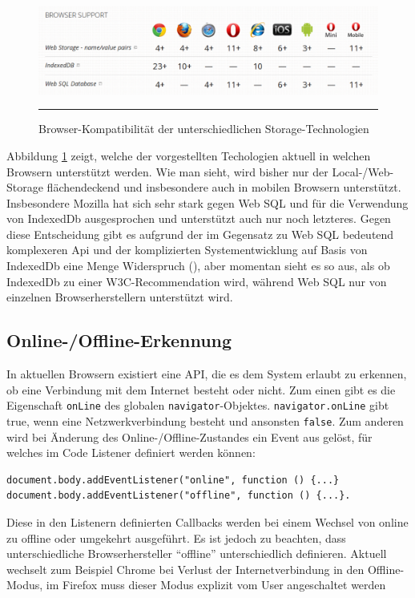 \begin{figure}[h]
  \centering
  \includegraphics[width=\textwidth,height=\textheight,keepaspectratio]{./Figures/storage_browser_compatibility.pdf}
    \rule{35em}{0.5pt}
  \caption[Storage Browser Kompatibilität]{Browser-Kompatibilität der unterschiedlichen Storage-Technologien}
  \label{fig:storage_browser_compatibility}
\end{figure}

Abbildung \ref{fig:storage_browser_compatibility} zeigt, welche der vorgestellten Techologien aktuell in welchen Browsern unterstützt werden. Wie man sieht, wird bisher nur der Local-/Web-Storage flächendeckend und insbesondere auch in mobilen Browsern unterstützt. Insbesondere Mozilla hat sich sehr stark gegen Web SQL und für die Verwendung von IndexedDb ausgesprochen und unterstützt auch nur noch letzteres. Gegen diese Entscheidung gibt es aufgrund der im Gegensatz zu Web SQL bedeutend komplexeren Api und der komplizierten Systementwicklung auf Basis von IndexedDb eine Menge Widerspruch (\cite{Ranganathan2010}), aber momentan sieht es so aus, als ob IndexedDb zu einer W3C-Recommendation wird, während Web SQL nur von einzelnen Browserherstellern unterstützt wird.

\subsection{Online-/Offline-Erkennung}\label{section:online_offline_erkennung}
In aktuellen Browsern existiert eine API, die es dem System erlaubt zu erkennen, ob eine Verbindung mit dem Internet besteht oder nicht. Zum einen gibt es die Eigenschaft \texttt{onLine} des globalen \texttt{navigator}-Objektes. \texttt{navigator.onLine} gibt true, wenn eine Netzwerkverbindung besteht und ansonsten \texttt{false}. Zum anderen wird bei Änderung des Online-/Offline-Zustandes ein Event aus gelöst, für welches im Code Listener definiert werden können:  

\begin{lstlisting}
document.body.addEventListener("online", function () {...} 
document.body.addEventListener("offline", function () {...}.
\end{lstlisting}          
Diese in den Listenern definierten Callbacks werden bei einem Wechsel von online zu offline oder umgekehrt ausgeführt. Es ist jedoch zu beachten, dass unterschiedliche Browserhersteller "`offline"' unterschiedlich definieren. Aktuell wechselt zum Beispiel Chrome bei Verlust der Internetverbindung in den Offline-Modus, im Firefox muss dieser Modus explizit vom User angeschaltet werden \cite{MozBug2011}

